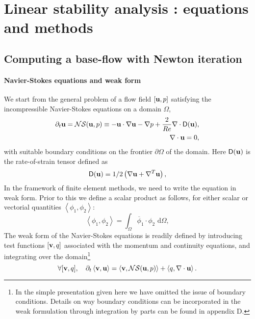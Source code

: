 \documentclass[twocolumn,10pt]{asme2ej}
\newcommand{\be}[1]{ \begin{equation} \label{#1}}
\newcommand{\ee}{\end{equation}}
\begin{document}
\section{Linear stability analysis : equations and methods}
\vspace{.2cm}

\subsection{Computing a base-flow with Newton iteration}
\vspace{.2cm}

\paragraph{Navier-Stokes equations and weak form}

We start from the general problem of a flow field $[{\bf u},p]$ satisfying the incompressible Navier-Stokes equations on a domain $\Omega$,
\begin{eqnarray} \label{NSprimitive}
\partial_t {\bf u} = {\cal NS} ({\bf u},p)
\equiv - {\bf u} \cdot \nabla {\bf u} - \nabla p + \frac{2}{Re}  \nabla \cdot {\mathsf{D}}({\bf u}),  \\
\nabla \cdot {\bf u} = 0,
\end{eqnarray}
with suitable boundary conditions on the frontier $\partial \Omega$ of the domain.
Here $ {\mathsf{D}}({\bf u}) $ is the rate-of-strain tensor defined as
$$
 {\mathsf{D}}({\bf u}) = 1/2
\left( \nabla {\bf u} +  \nabla^T  {\bf u}\right),
$$ 
In the framework of finite element methods, we need to write the equation in weak form.
Prior to this we define a scalar product as follows, for either scalar or vectorial quantities 
$\left< \phi_1, \phi_2 \right> $:
$$
\left< \phi_1, \phi_2 \right> = \int_\Omega \overline{\phi}_1 \cdot \phi_2   \mbox{ d} \Omega,
$$
The weak form of the Navier-Stokes equations is readily defined by introducing test functions 
$[{\bf v},q]$ associated with the momentum and continuity equations, and integrating over the domain\footnote{In the simple presentation given here we have omitted the issue of boundary conditions. Details on way boundary conditions can be incorporated in the weak formulation through integration by parts can be found in appendix D.}
\be{NSweak}
\forall [{\bf v},q], \quad \partial_t \left< {\bf v}, {\bf u}\right> = \left< {\bf v} , {\cal NS} ({\bf u},p) \right> + \left< q, \nabla \cdot {\bf u}\right>.
\ee
\end{document}
